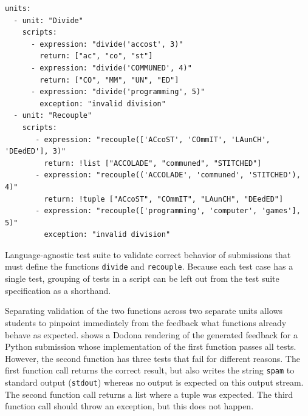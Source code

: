 \documentclass[../main]{subfiles}
\begin{document}
\begin{listing}
    \begin{verbatim}
units:
  - unit: "Divide"
    scripts:
      - expression: "divide('accost', 3)"
        return: ["ac", "co", "st"]
      - expression: "divide('COMMUNED', 4)"
        return: ["CO", "MM", "UN", "ED"]
      - expression: "divide('programming', 5)"
        exception: "invalid division"
  - unit: "Recouple"
    scripts:
       - expression: "recouple(['ACcoST', 'COmmIT', 'LAunCH', 'DEedED'], 3)"
         return: !list ["ACCOLADE", "communed", "STITCHED"]
       - expression: "recouple(('ACCOLADE', 'communed', 'STITCHED'), 4)"
         return: !tuple ["ACcoST", "COmmIT", "LAunCH", "DEedED"]
       - expression: "recouple(['programming', 'computer', 'games'], 5)"
         exception: "invalid division"
    \end{verbatim}
    \caption[]{
        Language-agnostic test suite to validate correct behavior of submissions that must define the functions \texttt{divide} and \texttt{recouple}.
        Because each test case has a single test, grouping of tests in a script can be left out from the test suite specification as a shorthand.
    }
    \label{lst:recouple-example}
\end{listing}

Separating validation of the two functions across two separate units allows students to pinpoint immediately from the feedback what functions already behave as expected.
 shows a Dodona rendering of the generated feedback for a Python submission whose implementation of the first function passes all tests.
However, the second function has three tests that fail for different reasons.
The first function call returns the correct result, but also writes the string \texttt{spam} to standard output (\texttt{stdout}) whereas no output is expected on this output stream.
The second function call returns a list where a tuple was expected.
The third function call should throw an exception, but this does not happen.
\end{document}
